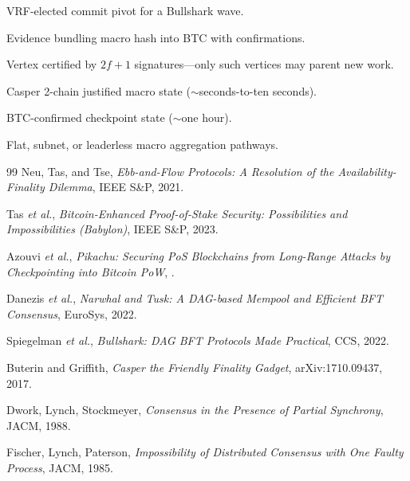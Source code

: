 \documentclass[11pt,a4paper,twoside]{report}
\theoremstyle{definition}
\begin{document}
\begin{description}[leftmargin=0pt,labelindent=0pt,itemsep=0.35em]
  \item[Anchor.] VRF-elected commit pivot for a Bullshark wave.
  \item[Bitcoin anchor proof.] Evidence bundling macro hash into BTC with confirmations.
  \item[Certified vertex.] Vertex certified by $2f{+}1$ signatures---only such vertices may parent new work.
  \item[Fast execution finality.] Casper 2-chain justified macro state ($\sim$seconds-to-ten seconds).
  \item[Sovereign epoch finality.] BTC-confirmed checkpoint state ($\sim$one hour).
  \item[Mode 0 / A / B.] Flat, subnet, or leaderless macro aggregation pathways.
\end{description}

\begin{thebibliography}{99}
Neu, Tas, and Tse,
\newblock \emph{Ebb-and-Flow Protocols: A Resolution of the Availability-Finality Dilemma},
\newblock IEEE S\&P, 2021.

Tas \emph{et al.},
\newblock \emph{Bitcoin-Enhanced Proof-of-Stake Security: Possibilities and Impossibilities (Babylon)},
\newblock IEEE S\&P, 2023.

Azouvi \emph{et al.},
\newblock \emph{Pikachu: Securing PoS Blockchains from Long-Range Attacks by Checkpointing into Bitcoin PoW},
.

Danezis \emph{et al.},
\newblock \emph{Narwhal and Tusk: A DAG-based Mempool and Efficient BFT Consensus},
\newblock EuroSys, 2022.

Spiegelman \emph{et al.},
\newblock \emph{Bullshark: DAG BFT Protocols Made Practical},
\newblock CCS, 2022.

Buterin and Griffith,
\newblock \emph{Casper the Friendly Finality Gadget},
\newblock arXiv:1710.09437, 2017.

Dwork, Lynch, Stockmeyer,
\newblock \emph{Consensus in the Presence of Partial Synchrony},
\newblock JACM, 1988.

Fischer, Lynch, Paterson,
\newblock \emph{Impossibility of Distributed Consensus with One Faulty Process},
\newblock JACM, 1985.
\end{thebibliography}
\end{document}
